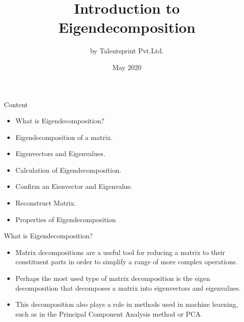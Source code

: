 \documentclass{beamer}
\title{Introduction to Eigendecomposition}
\author{by Talentsprint Pvt.Ltd.}
\date{May 2020}
\begin{document}
\maketitle
\begin{frame}{Content}
	\begin{itemize}
		\item What is Eigendecomposition? 
		\item Eigendecomposition of a matrix.
		\item Eigenvectors and Eigenvalues.
		\item Calculation of Eigendecomposition.
		\item Confirm an Eienvector and Eigenvalue.
		\item Reconstruct Matrix.
		\item Properties of Eigendecomposition
	\end{itemize}
\end{frame}
\begin{frame}{What is Eigendecomposition?}
\begin{itemize}
    \item Matrix decompositions are a useful tool for reducing a matrix to their constituent parts in order to simplify a range of more complex operations.
\vspace{10pt}
    \item Perhaps the most used type of matrix decomposition is the eigen decomposition that decomposes a matrix into eigenvectors and eigenvalues. \\
\vspace{10pt}
    \item This decomposition also plays a role in methods used in machine learning, such as in the Principal Component Analysis method or PCA.\\\
\end{itemize}
\end{frame}
\end{document}
